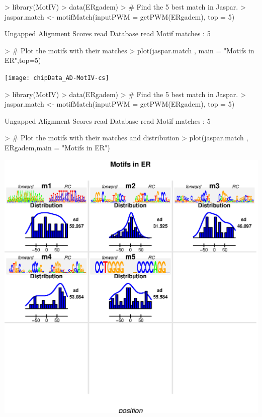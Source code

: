 \documentclass[12pt]{article}
\begin{document}
\begin{Schunk}
\begin{Sinput}
> library(MotIV)
> data(ERgadem)
> # Find the 5 best match in Jaspar.
> jaspar.match <- motifMatch(inputPWM = getPWM(ERgadem), top = 5)
\end{Sinput}
\begin{Soutput}
	Ungapped Alignment
	Scores read
	Database read
	Motif matches : 5
\end{Soutput}
\begin{Sinput}
> # Plot the motifs with their matches
> plot(jaspar.match , main = "Motifs in ER",top=5)
\end{Sinput}
\end{Schunk}
\texttt{[image: chipData\_AD-MotIV-cs]}
\begin{Schunk}
\begin{Sinput}
> library(MotIV)
> data(ERgadem)
> # Find the 5 best match in Jaspar.
> jaspar.match <- motifMatch(inputPWM = getPWM(ERgadem), top = 5)
\end{Sinput}
\begin{Soutput}
	Ungapped Alignment
	Scores read
	Database read
	Motif matches : 5
\end{Soutput}
\begin{Sinput}
> # Plot the motifs with their matches and distribution
> plot(jaspar.match , ERgadem,main = "Motifs in ER")
\end{Sinput}
\end{Schunk}
\includegraphics{chipData_AD-MotIV-cs2}
\end{document}
